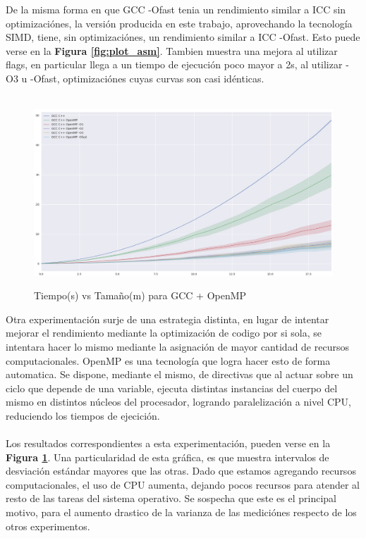 De la misma forma en que GCC -Ofast tenia un rendimiento similar a ICC sin optimizaciónes, la versión producida en este trabajo, aprovechando la tecnología SIMD, tiene, sin optimizaciónes, un rendimiento similar a ICC -Ofast. Esto puede verse en la \textbf{Figura \ref{fig:plot_asm}}. Tambien muestra una mejora al utilizar flags, en particular llega a un tiempo de ejecución poco mayor a 2s, al utilizar -O3 u -Ofast, optimizaciónes cuyas curvas son casi idénticas.
~\\
~\\
\begin{figure}[!htbp]
\caption{Tiempo(s) vs Tamaño(m) para GCC + OpenMP}
\includegraphics[width=\textwidth]{imagenes/plot_omp.png}
\label{fig:plot_omp}
\end{figure}
Otra experimentación surje de una estrategia distinta, en lugar de intentar mejorar el rendimiento mediante la optimización de codigo por si sola, se intentara hacer lo mismo mediante la asignación de mayor cantidad de recursos computacionales. OpenMP es una tecnología que logra hacer esto de forma automatica. Se dispone, mediante el mismo, de directivas que al actuar sobre un ciclo que depende de una variable, ejecuta distintas instancias del cuerpo del mismo en distintos núcleos del procesador, logrando paralelización a nivel CPU, reduciendo los tiempos de ejecición.
~\\
~\\
Los resultados correspondientes a esta experimentación, pueden verse en la \textbf{Figura \ref{fig:plot_omp}}. Una particularidad de esta gráfica, es que muestra intervalos de desviación estándar mayores que las otras. Dado que estamos agregando recursos computacionales, el uso de CPU aumenta, dejando pocos recursos para atender al resto de las tareas del sistema operativo. Se sospecha que este es el principal motivo, para el aumento drastico de la varianza de las mediciónes respecto de los otros experimentos.
